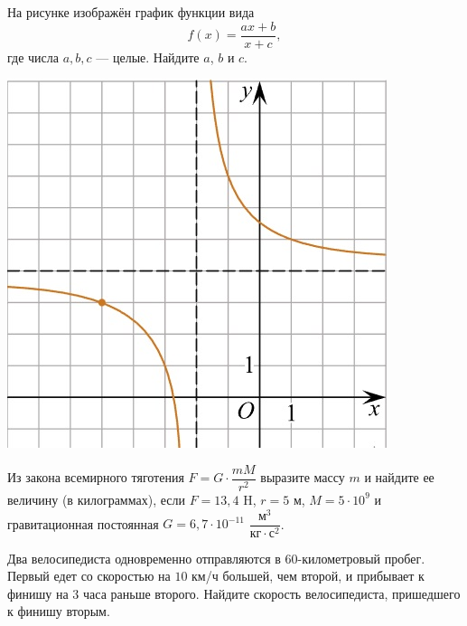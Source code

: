 \begin{class}[number=10]
\begin{listofex}
\begin{minipage}[t]{\picwidth}
		\end{minipage}
		\item
		\begin{minipage}[t]{\bodywidth}
			На рисунке изображён график функции вида \[ f(x)=\dfrac{ax+b}{x+c}, \] где числа \(a, b, c\) --- целые. Найдите \( a \), \( b \) и \( c \).
		\end{minipage}
		\hspace{0.02\linewidth}
		\begin{minipage}[t]{\picwidth}
			\includegraphics[align=t, width=\linewidth]{../../pics/G101M4C6-5}
		\end{minipage}
		\item Из закона всемирного тяготения \( F=G\cdot\dfrac{mM}{r^2} \) выразите массу \( m \) и найдите ее величину (в килограммах), если \( F=13,4 \) H, \( r=5 \) м, \( M=5\cdot10^9 \) и гравитационная постоянная \( G=6,7\cdot10^{-11} \) \( \dfrac{\text{м}^3}{\text{кг}\cdot\text{с}^2} \).
		\item Два велосипедиста одновременно отправляются в \( 60 \)-километровый пробег. Первый едет со скоростью на \( 10 \) км/ч большей, чем второй, и прибывает к финишу на \( 3 \) часа раньше второго. Найдите скорость велосипедиста, пришедшего к финишу вторым.
	\end{listofex}
\end{class}
